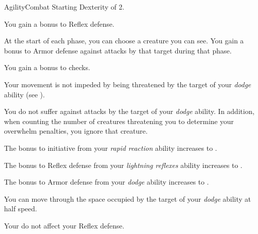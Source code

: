     \begin{feat}{Agility}{Combat}
        \featpre Starting Dexterity of 2.
        \featben

         You gain a  bonus to Reflex defense.

         At the start of each phase, you can choose a creature you can see.
        You gain a  bonus to Armor defense against attacks by that target during that phase.

         You gain a  bonus to  checks.

         Your movement is not impeded by being threatened by the target of your \textit{dodge} ability (see ).

         You do not suffer  against attacks by the target of your \textit{dodge} ability.
        In addition, when counting the number of creatures threatening you to determine your overwhelm penalties, you ignore that creature.

         The bonus to initiative from your \textit{rapid reaction} ability increases to .

         The bonus to Reflex defense from your \textit{lightning reflexes} ability increases to .

         The bonus to Armor defense from your \textit{dodge} ability increases to .

         You can move through the space occupied by the target of your \textit{dodge} ability at half speed.

         Your  do not affect your Reflex defense.
    \end{feat}

